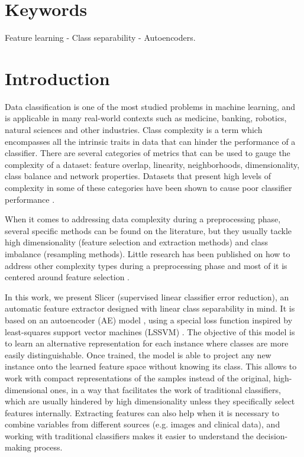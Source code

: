 \section*{Keywords}Feature learning  - Class separability - Autoencoders.

\section{Introduction}\label{p7sec.intro}

Data classification \cite{Aggarwal2015} is one of the most studied problems in machine learning, and is applicable in many real-world contexts such as medicine, banking, robotics, natural sciences and other industries. Class complexity \cite{pascual2021revisiting,basu2006data} is a term which encompasses all the intrinsic traits in data that can hinder the performance of a classifier. There are several categories of metrics that can be used to gauge the complexity of a dataset: feature overlap, linearity, neighborhoods, dimensionality, class balance and network properties. Datasets that present high levels of complexity in some of these categories have been shown to cause poor classifier performance \cite{luengo2011addressing}.

When it comes to addressing data complexity during a preprocessing \cite{garcia2015data} phase, several specific methods can be found on the literature, but they usually tackle high dimensionality (feature selection and extraction methods) and class imbalance (resampling methods). Little research has been published on how to address other complexity types during a preprocessing phase and most of it is centered around feature selection \cite{zhang2013divergence,wang2008feature}.

In this work, we present Slicer (supervised linear classifier error reduction), an automatic feature extractor designed with linear class separability in mind. It is based on an autoencoder (AE) model \cite{charte-tutorial}, using a special loss function inspired by least-squares support vector machines (LSSVM) \cite{suykens1999least}. The objective of this model is to learn an alternative representation for each instance where classes are more easily distinguishable. Once trained, the model is able to project any new instance onto the learned feature space without knowing its class. This allows to work with compact representations of the samples instead of the original, high-dimensional ones, in a way that facilitates the work of traditional classifiers, which are usually hindered by high dimensionality \cite{aggarwal2001surprising,beyer1999nearest} unless they specifically select features internally. Extracting features can also help when it is necessary to combine variables from different sources (e.g. images and clinical data), and working with traditional classifiers makes it easier to understand the decision-making process.

